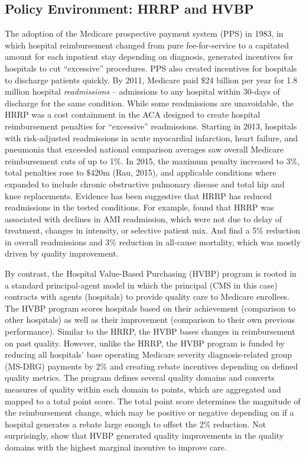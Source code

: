 \documentclass[12pt]{article}
\begin{document}
\subsection{Policy Environment: HRRP and HVBP}
The adoption of the Medicare prospective payment system (PPS) in 1983, in which hospital reimbursement changed from pure fee-for-service to a capitated amount for each inpatient stay depending on diagnosis, generated incentives for hospitals to cut ``excessive'' procedures. PPS also created incentives for hospitals to discharge patients quickly.  By 2011, Medicare paid $\$$24 billion per year for 1.8 million hospital \textit{readmissions} -- admissions to any hospital within 30-days of discharge for the same condition.  While some readmissions are unavoidable, the HRRP was a cost containment in the ACA designed to create hospital reimbursement penalties for ``excessive'' readmissions.  Starting in 2013, hospitals with risk-adjusted readmissions in acute myocardial infarction, heart failure, and pneumonia that exceeded national comparison averages saw overall Medicare reimbursement cuts of up to 1$\%$.   In 2015, the maximum penalty increased to 3$\%$, total penalties rose to $\$$420m (Rau, 2015), and applicable conditions where expanded to include chronic obstructive pulmonary disease and total hip and knee replacements.  Evidence has been suggestive that HRRP has reduced readmissions in the tested conditions.  For example, \cite{mellor2016} found that HRRP was associated with declines in AMI readmission, which were not due to delay of treatment, changes in intensity, or selective patient mix. And \cite{gupta2017} find a 5$\%$ reduction in overall readmissions and 3$\%$ reduction in all-cause mortality, which was mostly driven by quality improvement.

By contrast, the Hospital Value-Based Purchasing (HVBP) program is rooted in a standard principal-agent model in which the principal (CMS in this case) contracts with agents (hospitals) to provide quality care to Medicare enrollees. The HVBP program scores hospitals based on their achievement (comparison to other hospitals) as well as their improvement (comparison to their own previous performance).  Similar to the HRRP, the HVBP bases changes in reimbursement on past quality.  However, unlike the HRRP, the HVBP program is funded by reducing all hospitals' base operating Medicare severity diagnosis-related group (MS-DRG) payments by 2$\%$ and creating rebate incentives depending on defined quality metrics.  The program defines several quality domains and converts measures of quality within each domain to points, which are aggregated and mapped to a total point score.  The total point score determines the magnitude of the reimbursement change, which may be positive or negative depending on if a hospital generates a rebate large enough to offset the 2$\%$ reduction.  Not surprisingly, \cite{norton2016} show that HVBP generated quality improvements in the quality domains with the highest marginal incentive to improve care.
\end{document}
